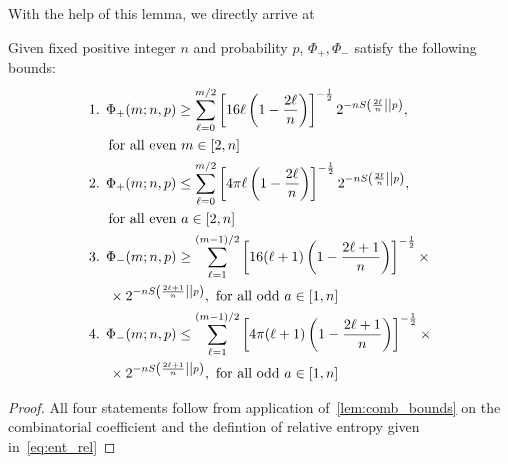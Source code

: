 With the help of this lemma, we directly arrive at 
\begin{theorem}\label{thm:bounds_strict}
	Given fixed positive integer $n$ and probability $p$, $\Phi_+, \Phi_-$ satisfy the following bounds:
	\begin{align*}
		\begin{split}
		&\text{1. } \Phi_+(m; n, p) \geq \sum\limits_{\ell=0}^{m/2}\left[ 16\ell\left(1-\frac{2\ell}{n}\right) \right]^{-\frac{1}{2}} 2^{-n\ent{\frac{2\ell}{n}}{p}}, \\
		&\hspace{14pt} \text{for all even } m\in [2,n] \\
		&\text{2. } \Phi_+(m; n, p) \leq \sum\limits_{\ell=0}^{m/2}\left[ 4\pi\ell\left(1-\frac{2\ell}{n}\right) \right]^{-\frac{1}{2}} 2^{-n\ent{\frac{2\ell}{n}}{p}}, \\
		&\hspace{14pt} \text{for all even } a\in [2,n] \\
		&\text{3. } \Phi_-(m; n, p) \geq \sum\limits_{\ell=1}^{(m-1)/2}\left[ 16(\ell+1)\left(1-\frac{2\ell+1}{n}\right) \right]^{-\frac{1}{2}} \times \\
		&\hspace{14pt} \times 2^{-n\ent{\frac{2\ell+1}{n}}{p}},\ \text{for all odd }a\in [1,n] \\
		&\text{4. } \Phi_-(m; n, p) \leq \sum\limits_{\ell=1}^{(m-1)/2}\left[ 4\pi(\ell+1)\left(1-\frac{2\ell+1}{n}\right) \right]^{-\frac{1}{2}} \times \\
		&\hspace{14pt} \times 2^{-n\ent{\frac{2\ell+1}{n}}{p}},\ \text{for all odd } a\in [1,n]
		\end{split}
	\end{align*}
\end{theorem}
\begin{proof}
	All four statements follow from application of~\cref{lem:comb_bounds} on the combinatorial coefficient and the defintion of relative entropy given in~\cref{eq:ent_rel}
\end{proof}

